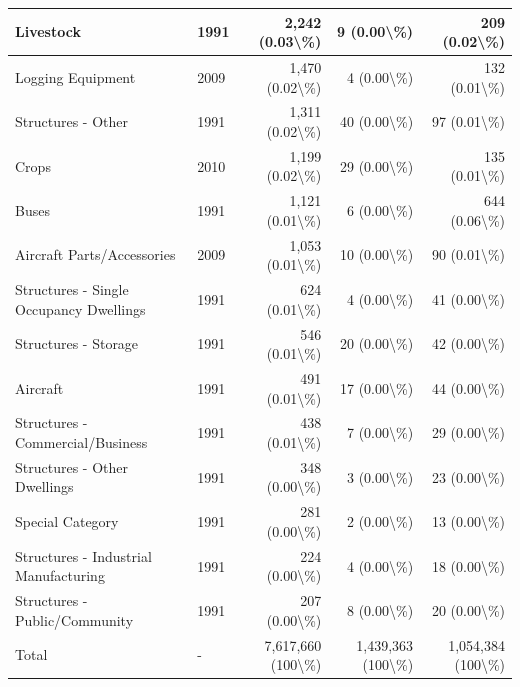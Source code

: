 \documentclass[
]{krantz}
\begin{document}
\begin{longtable}[t]{l|l|r|r|r}
\hline
Livestock & 1991 & 2,242 (0.03\textbackslash{}\%) & 9 (0.00\textbackslash{}\%) & 209 (0.02\textbackslash{}\%)\\
\hline
Logging Equipment & 2009 & 1,470 (0.02\textbackslash{}\%) & 4 (0.00\textbackslash{}\%) & 132 (0.01\textbackslash{}\%)\\
\hline
Structures - Other & 1991 & 1,311 (0.02\textbackslash{}\%) & 40 (0.00\textbackslash{}\%) & 97 (0.01\textbackslash{}\%)\\
\hline
Crops & 2010 & 1,199 (0.02\textbackslash{}\%) & 29 (0.00\textbackslash{}\%) & 135 (0.01\textbackslash{}\%)\\
\hline
Buses & 1991 & 1,121 (0.01\textbackslash{}\%) & 6 (0.00\textbackslash{}\%) & 644 (0.06\textbackslash{}\%)\\
\hline
Aircraft Parts/Accessories & 2009 & 1,053 (0.01\textbackslash{}\%) & 10 (0.00\textbackslash{}\%) & 90 (0.01\textbackslash{}\%)\\
\hline
Structures - Single Occupancy Dwellings & 1991 & 624 (0.01\textbackslash{}\%) & 4 (0.00\textbackslash{}\%) & 41 (0.00\textbackslash{}\%)\\
\hline
Structures - Storage & 1991 & 546 (0.01\textbackslash{}\%) & 20 (0.00\textbackslash{}\%) & 42 (0.00\textbackslash{}\%)\\
\hline
Aircraft & 1991 & 491 (0.01\textbackslash{}\%) & 17 (0.00\textbackslash{}\%) & 44 (0.00\textbackslash{}\%)\\
\hline
Structures - Commercial/Business & 1991 & 438 (0.01\textbackslash{}\%) & 7 (0.00\textbackslash{}\%) & 29 (0.00\textbackslash{}\%)\\
\hline
Structures - Other Dwellings & 1991 & 348 (0.00\textbackslash{}\%) & 3 (0.00\textbackslash{}\%) & 23 (0.00\textbackslash{}\%)\\
\hline
Special Category & 1991 & 281 (0.00\textbackslash{}\%) & 2 (0.00\textbackslash{}\%) & 13 (0.00\textbackslash{}\%)\\
\hline
Structures - Industrial Manufacturing & 1991 & 224 (0.00\textbackslash{}\%) & 4 (0.00\textbackslash{}\%) & 18 (0.00\textbackslash{}\%)\\
\hline
Structures - Public/Community & 1991 & 207 (0.00\textbackslash{}\%) & 8 (0.00\textbackslash{}\%) & 20 (0.00\textbackslash{}\%)\\
\hline
Total & - & 7,617,660 (100\textbackslash{}\%) & 1,439,363 (100\textbackslash{}\%) & 1,054,384 (100\textbackslash{}\%)\\
\hline
\end{longtable}
\end{document}
